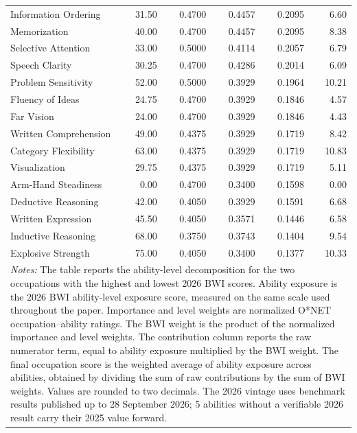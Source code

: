\begin{longtable}{lrrrrr}
  Information Ordering & 31.50 & 0.4700 & 0.4457 & 0.2095 & 6.60 \\
  Memorization & 40.00 & 0.4700 & 0.4457 & 0.2095 & 8.38 \\
  Selective Attention & 33.00 & 0.5000 & 0.4114 & 0.2057 & 6.79 \\
  Speech Clarity & 30.25 & 0.4700 & 0.4286 & 0.2014 & 6.09 \\
  Problem Sensitivity & 52.00 & 0.5000 & 0.3929 & 0.1964 & 10.21 \\
  Fluency of Ideas & 24.75 & 0.4700 & 0.3929 & 0.1846 & 4.57 \\
  Far Vision & 24.00 & 0.4700 & 0.3929 & 0.1846 & 4.43 \\
  Written Comprehension & 49.00 & 0.4375 & 0.3929 & 0.1719 & 8.42 \\
  Category Flexibility & 63.00 & 0.4375 & 0.3929 & 0.1719 & 10.83 \\
  Visualization & 29.75 & 0.4375 & 0.3929 & 0.1719 & 5.11 \\
  Arm-Hand Steadiness & 0.00 & 0.4700 & 0.3400 & 0.1598 & 0.00 \\
  Deductive Reasoning & 42.00 & 0.4050 & 0.3929 & 0.1591 & 6.68 \\
  Written Expression & 45.50 & 0.4050 & 0.3571 & 0.1446 & 6.58 \\
  Inductive Reasoning & 68.00 & 0.3750 & 0.3743 & 0.1404 & 9.54 \\
  Explosive Strength & 75.00 & 0.4050 & 0.3400 & 0.1377 & 10.33 \\
\multicolumn{6}{p{0.95\linewidth}}{\footnotesize \textit{Notes:} The table reports the ability-level decomposition for the two occupations with the highest and lowest 2026 BWI scores. Ability exposure is the 2026 BWI ability-level exposure score, measured on the same scale used throughout the paper. Importance and level weights are normalized O*NET occupation--ability ratings. The BWI weight is the product of the normalized importance and level weights. The contribution column reports the raw numerator term, equal to ability exposure multiplied by the BWI weight. The final occupation score is the weighted average of ability exposure across abilities, obtained by dividing the sum of raw contributions by the sum of BWI weights. Values are rounded to two decimals. The 2026 vintage uses benchmark results published up to 28 September 2026; 5 abilities without a verifiable 2026 result carry their 2025 value forward.} \
\end{longtable}
